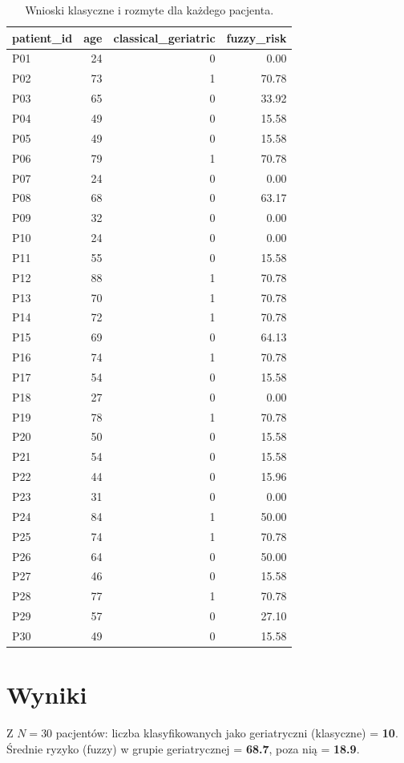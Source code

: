 \documentclass[12pt,a4paper]{article}
\begin{document}
\begin{table}[H]
\centering
\begin{tabular}{lrrr}
\toprule
patient\_id & age & classical\_geriatric & fuzzy\_risk \\
\midrule
P01 & 24 & 0 & 0.00 \\
P02 & 73 & 1 & 70.78 \\
P03 & 65 & 0 & 33.92 \\
P04 & 49 & 0 & 15.58 \\
P05 & 49 & 0 & 15.58 \\
P06 & 79 & 1 & 70.78 \\
P07 & 24 & 0 & 0.00 \\
P08 & 68 & 0 & 63.17 \\
P09 & 32 & 0 & 0.00 \\
P10 & 24 & 0 & 0.00 \\
P11 & 55 & 0 & 15.58 \\
P12 & 88 & 1 & 70.78 \\
P13 & 70 & 1 & 70.78 \\
P14 & 72 & 1 & 70.78 \\
P15 & 69 & 0 & 64.13 \\
P16 & 74 & 1 & 70.78 \\
P17 & 54 & 0 & 15.58 \\
P18 & 27 & 0 & 0.00 \\
P19 & 78 & 1 & 70.78 \\
P20 & 50 & 0 & 15.58 \\
P21 & 54 & 0 & 15.58 \\
P22 & 44 & 0 & 15.96 \\
P23 & 31 & 0 & 0.00 \\
P24 & 84 & 1 & 50.00 \\
P25 & 74 & 1 & 70.78 \\
P26 & 64 & 0 & 50.00 \\
P27 & 46 & 0 & 15.58 \\
P28 & 77 & 1 & 70.78 \\
P29 & 57 & 0 & 27.10 \\
P30 & 49 & 0 & 15.58 \\
\bottomrule
\end{tabular}

\caption{Wnioski klasyczne i rozmyte dla każdego pacjenta.}
\label{tab:all}
\end{table}


\section{Wyniki}
Z $N=30$ pacjentów: liczba klasyfikowanych jako geriatryczni (klasyczne) = \textbf{10}. Średnie ryzyko (fuzzy) w grupie geriatrycznej = \textbf{68.7}, poza nią = \textbf{18.9}.
\end{document}
